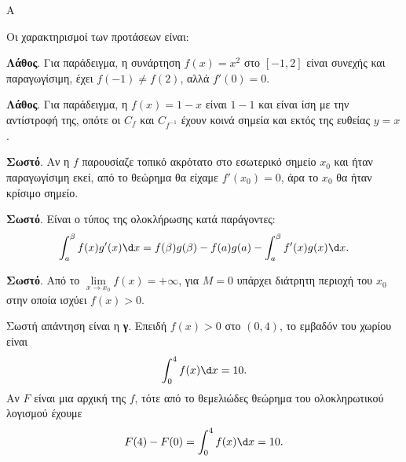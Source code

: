 \begin{thema}{Α}
\begin{erwthma}
\item {}

\item {}

\item {}

\item Οι χαρακτηρισμοί των προτάσεων είναι:
\begin{alist}
\item \textbf{Λάθος}. Για παράδειγμα, η συνάρτηση $f(x)=x^2$ στο $[-1,2]$ είναι συνεχής και παραγωγίσιμη, έχει $f(-1)\neq f(2)$, αλλά $f'(0)=0$.
\item \textbf{Λάθος}. Για παράδειγμα, η $f(x)=1-x$ είναι $1-1$ και είναι ίση με την αντίστροφή της, οπότε οι $C_f$ και $C_{f^{-1}}$ έχουν κοινά σημεία και εκτός της ευθείας $y=x$.
\item \textbf{Σωστό}. Αν η $f$ παρουσίαζε τοπικό ακρότατο στο εσωτερικό σημείο $x_0$ και ήταν παραγωγίσιμη εκεί, από το θεώρημα  θα είχαμε $f'(x_0)=0$, άρα το $x_0$ θα ήταν κρίσιμο σημείο.
\item \textbf{Σωστό}. Είναι ο τύπος της ολοκλήρωσης κατά παράγοντες:
\[
\dint_a^\beta f(x)g'(x)\d x
=f(\beta)g(\beta)-f(a)g(a)-\dint_a^\beta f'(x)g(x)\d x.
\]
\item \textbf{Σωστό}. Από το $\lim\limits_{x\to x_0}f(x)=+\infty$, για $M=0$ υπάρχει διάτρητη περιοχή του $x_0$ στην οποία ισχύει $f(x)>0$.
\end{alist}

\item Σωστή απάντηση είναι η \textbf{γ}. Επειδή $f(x)>0$ στο $(0,4)$, το εμβαδόν του χωρίου είναι
\[
\dint_0^4 f(x)\d x=10.
\]
Αν $F$ είναι μια αρχική της $f$, τότε από το θεμελιώδες θεώρημα του ολοκληρωτικού λογισμού έχουμε
\[
F(4)-F(0)=\dint_0^4 f(x)\d x=10.
\]
\end{erwthma}
\end{thema}

